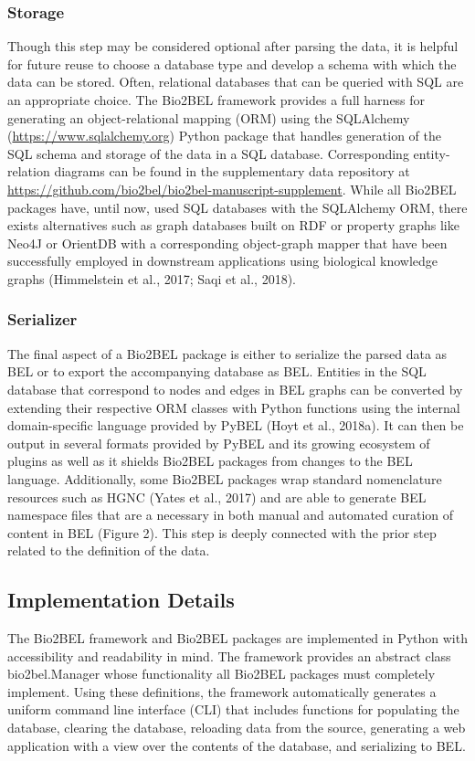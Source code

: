 \subsubsection*{Storage}
Though this step may be considered optional after parsing the data, it is helpful for future reuse to choose a database type and develop a schema with which the data can be stored.
Often, relational databases that can be queried with SQL are an appropriate choice.
The Bio2BEL framework provides a full harness for generating an object-relational mapping (ORM) using the SQLAlchemy (\url{https://www.sqlalchemy.org}) Python package that handles generation of the SQL schema and storage of the data in a SQL database.
Corresponding entity-relation diagrams can be found in the supplementary data repository at \url{https://github.com/bio2bel/bio2bel-manuscript-supplement}.
While all Bio2BEL packages have, until now, used SQL databases with the SQLAlchemy ORM, there exists alternatives such as graph databases built on RDF or property graphs like Neo4J or OrientDB with a corresponding object-graph mapper that have been successfully employed in downstream applications using biological knowledge graphs (Himmelstein et al., 2017; Saqi et al., 2018).

\subsubsection*{Serializer}
The final aspect of a Bio2BEL package is either to serialize the parsed data as BEL or to export the accompanying database as BEL. Entities in the SQL database that correspond to nodes and edges in BEL graphs can be converted by extending their respective ORM classes with Python functions using the internal domain-specific language provided by PyBEL (Hoyt et al., 2018a).
It can then be output in several formats provided by PyBEL and its growing ecosystem of plugins as well as it shields Bio2BEL packages from changes to the BEL language.
Additionally, some Bio2BEL packages wrap standard nomenclature resources such as HGNC (Yates et al., 2017) and are able to generate BEL namespace files that are a necessary in both manual and automated curation of content in BEL (Figure 2).
This step is deeply connected with the prior step related to the definition of the data.

\subsection*{Implementation Details}
The Bio2BEL framework and Bio2BEL packages are implemented in Python with accessibility and readability in mind.
The framework provides an abstract class bio2bel.Manager whose functionality all Bio2BEL packages must completely implement.
Using these definitions, the framework automatically generates a uniform command line interface (CLI) that includes functions for populating the database, clearing the database, reloading data from the source, generating a web application with a view over the contents of the database, and serializing to BEL\@.

